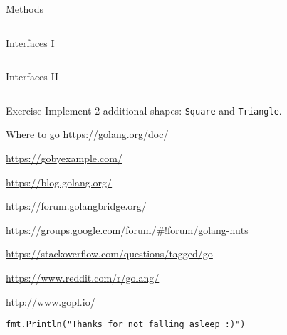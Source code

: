 \documentclass[10pt]{beamer}
\begin{document}
	
	\begin{frame}[t,fragile]{Methods}
		\inputminted[fontsize=\scriptsize]{go}{code/16_methods.go}
	\end{frame}
	
	
	\begin{frame}[t,fragile]{Interfaces I}
		\inputminted[fontsize=\scriptsize]{go}{code/17_interfaces.go}
	\end{frame}
	
	
	\begin{frame}[t,fragile]{Interfaces II}
		\inputminted[fontsize=\scriptsize,firstnumber=last]{go}{code/17b_interfaces.go}
	\end{frame}
	
	
	\begin{frame}[fragile]{Exercise}
		Implement 2 additional shapes: \texttt{Square} and \texttt{Triangle}.
	\end{frame}
	
	
	\begin{frame}[fragile]{Where to go}
		\href{https://golang.org/doc/}{https://golang.org/doc/}
		
		\href{https://gobyexample.com/}{https://gobyexample.com/}
		
		\href{https://blog.golang.org/}{https://blog.golang.org/}
		
		\href{https://forum.golangbridge.org/}{https://forum.golangbridge.org/}
		
		\href{https://groups.google.com/forum/#!forum/golang-nuts}{https://groups.google.com/forum/\#!forum/golang-nuts}
		
		\href{https://stackoverflow.com/questions/tagged/go}{https://stackoverflow.com/questions/tagged/go}
		
		\href{https://www.reddit.com/r/golang/}{https://www.reddit.com/r/golang/}
		
		\href{http://www.gopl.io/}{http://www.gopl.io/}
	\end{frame}
									
	
	\begin{frame}[fragile]{}
		\begin{center}
			\texttt{fmt.Println("Thanks for not falling asleep :)")}
		\end{center}
	\end{frame}
\end{document}

